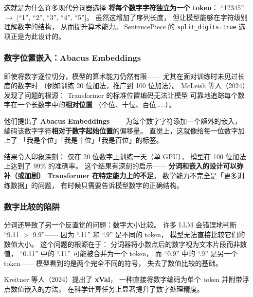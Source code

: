 这就是为什么许多现代分词器选择
\textbf{将每个数字字符独立为一个 token}：
``12345'' $\to$ [``1'', ``2'', ``3'', ``4'', ``5'']。
虽然这增加了序列长度，
但让模型能够在字符级别理解数字的结构，
从而提升算术能力。
SentencePiece 的 \texttt{split\_digits=True}
选项正是为此设计的。

\subsubsection{数字位置嵌入：Abacus Embeddings}

即使将数字逐位切分，模型的算术能力仍然有限——
尤其在面对训练时未见过长度的数字时
（例如训练 20 位加法，推广到 100 位加法）。
McLeish 等人（2024）发现了问题的根源：
Transformer 的标准位置编码无法让模型
可靠地追踪每个数字在一个长数字中的\textbf{相对位置}
（个位、十位、百位……）。

他们提出了 \textbf{Abacus Embeddings}——
为每个数字字符添加一个额外的嵌入，
编码该数字字符\textbf{相对于数字起始位置}的偏移量。
直觉上，这就像给每一位数字加上了
「我是个位」「我是十位」「我是百位」的标签。

结果令人印象深刻：
仅在 20 位数字上训练一天（单 GPU），
模型在 100 位加法上达到了 99\% 的准确率。
这个结果有深刻的启示——
\textbf{分词和嵌入的设计可以弥补（或加剧）
Transformer 在特定能力上的不足}。
数学能力不完全是「更多训练数据」的问题，
有时候只需要告诉模型数字的正确结构。

\subsubsection{数字比较的陷阱}

分词还导致了另一个反直觉的问题：数字大小比较。
许多 LLM 会错误地判断 ``9.11 $>$ 9.9''——
因为 ``.11'' 和 ``.9'' 是不同的 token，
模型无法直接比较它们的数值大小。
这个问题的根源在于：
分词器将小数点后的数字视为文本片段而非数值，
``0.11'' 中的 ``.11'' 可能被合并为一个 token，
而 ``0.9'' 中的 ``.9'' 是另一个 token——
模型看到的是两个完全不同的符号，
失去了数值比较的基础。

Kreitner 等人（2024）提出了 \textbf{xVal}，
一种直接将数字编码为单个 token 并附带浮点数值嵌入的方法，
在科学计算任务上显著提升了数字处理精度。

